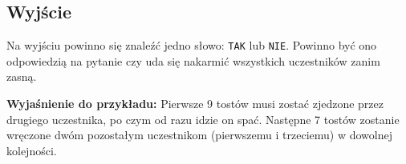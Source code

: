\documentclass[zad,zawodnik,utf8]{sinol}
\begin{document}
\begin{tasktext}
  \section{Wyjście}
Na wyjściu powinno się znaleźć jedno słowo: \texttt{TAK} lub \texttt{NIE}. Powinno być ono odpowiedzią na pytanie czy uda się nakarmić wszystkich uczestników zanim zasną.

\makecompactexample

\textbf{Wyjaśnienie do przykładu:} Pierwsze 9 tostów musi zostać zjedzone przez drugiego uczestnika, po czym od razu idzie on spać. Następne 7 tostów zostanie wręczone dwóm pozostałym uczestnikom (pierwszemu i trzeciemu) w dowolnej kolejności.

\end{tasktext}
\end{document}
